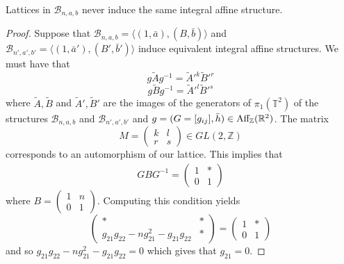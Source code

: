 \begin{theorem}
    Lattices in $\mathcal{B}_{n,a,b}$ never induce the same integral affine
    structure.
\end{theorem}
\begin{proof}
    Suppose that $\mathcal{B}_{n,a,b} =\langle\left( 1, \bar{a} \right),  \left( B, \bar{b} \right) \rangle$ and $\mathcal{B}_{n',a',b'}= \langle\left( 1, \bar{a}' \right),  \left( B', \bar{b}' \right) \rangle$ induce equivalent integral affine structures. We must have that
    \begin{equation}\label{eq:first-conjugacy}
        g\tilde{A}g^{-1} = \tilde{A}'^k\tilde{B}'^r
    \end{equation}
    \begin{equation}
        \label{eq:second-conjugacy}
        g\tilde{B}g^{-1} = \tilde{A}'^l\tilde{B}'^s
    \end{equation}
    where $\tilde{A}, \tilde{B}$ and $\tilde{A}', \tilde{B}'$ are the images of the generators of $\pi_1(\mathbb{T}^2)$ of the structures $\mathcal{B}_{n,a,b}$ and $\mathcal{B}_{n',a',b'}$ and $g = (G = [g_{ij}], \bar{h})\in \text{Aff}_{\mathbb{Z}}(\mathbb{R}^2)$. The matrix
    $$M = \begin{pmatrix}
            k & l \\ r & s
        \end{pmatrix} \in GL(2, \mathbb{Z})$$
    corresponds to an automorphism of our lattice. This implies that
    \begin{align*}
        GBG^{-1} = \begin{pmatrix}
                       1 & * \\
                       0 & 1
                   \end{pmatrix}
    \end{align*}
    where $B = \begin{pmatrix}
            1 & n \\
            0 & 1
        \end{pmatrix}$. Computing this condition yields
    $$
        \begin{pmatrix}
            *                                       & * \\
            g_{21}g_{22} - ng_{21}^2 - g_{21}g_{22} & *
        \end{pmatrix} = \begin{pmatrix}
            1 & * \\
            0 & 1
        \end{pmatrix}
    $$
    and so $g_{21}g_{22} - ng_{21}^2 - g_{21}g_{22} = 0$ which gives that $g_{21} = 0$.


\end{proof}
